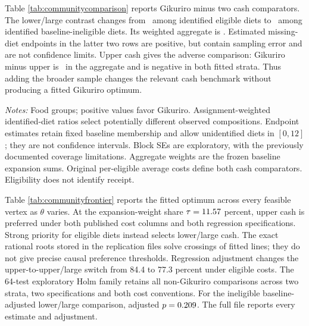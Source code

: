 \documentclass[11pt]{article}
\begin{document}
Table \ref{tab:communitycomparison} reports Gikuriro minus two cash comparators. The lower/large contrast changes from \CommunityEligibleLowerLarge\ among identified eligible diets to \CommunityIneligibleLowerLarge\ among identified baseline-ineligible diets. Its weighted aggregate is \CommunityAggregateLowerLarge. Estimated missing-diet endpoints in the latter two rows are positive, but contain sampling error and are not confidence limits. Upper cash gives the adverse comparison: Gikuriro minus upper is \CommunityAggregateUpper\ in the aggregate and is negative in both fitted strata. Thus adding the broader sample changes the relevant cash benchmark without producing a fitted Gikuriro optimum.

\begin{table}[t]
\centering\caption{Population choice and Gikuriro's cash comparison}\label{tab:communitycomparison}
\resizebox{\textwidth}{!}{}
\begin{minipage}{\textwidth}\footnotesize\emph{Notes:} Food groups; positive values favor Gikuriro. Assignment-weighted identified-diet ratios select potentially different observed compositions. Endpoint estimates retain fixed baseline membership and allow unidentified diets in $[0,12]$; they are not confidence intervals. Block SEs are exploratory, with the previously documented coverage limitations. Aggregate weights are the frozen baseline expansion sums. Original per-eligible average costs define both cash comparators. Eligibility does not identify receipt.\end{minipage}
\end{table}

Table \ref{tab:communityfrontier} reports the fitted optimum across every feasible vertex as $\theta$ varies. At the expansion-weight share $\tau=11.57$ percent, upper cash is preferred under both published cost columns and both regression specifications. Strong priority for eligible diets instead selects lower/large cash. The exact rational roots stored in the replication files solve crossings of fitted lines; they do not give precise causal preference thresholds. Regression adjustment changes the upper-to-upper/large switch from 84.4 to 77.3 percent under eligible costs. The 64-test exploratory Holm family retains all non-Gikuriro comparisons across two strata, two specifications and both cost conventions. For the ineligible baseline-adjusted lower/large comparison, adjusted $p=0.209$. The full file reports every estimate and adjustment.
\end{document}

